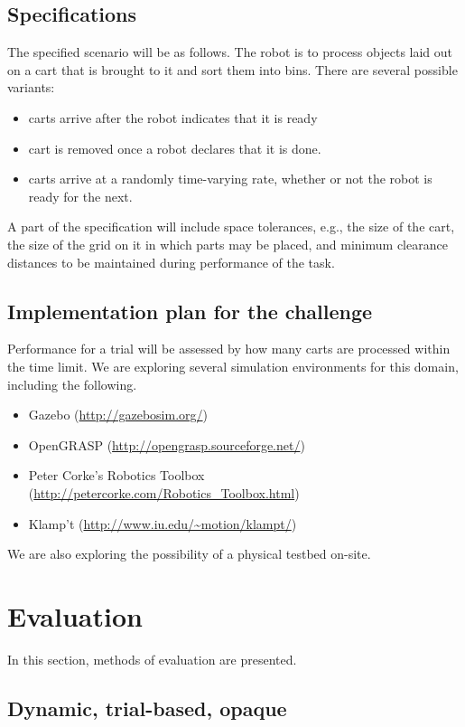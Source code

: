 \documentclass{amsart}
\theoremstyle{definition}
\begin{document}
\subsection{Specifications}
The specified scenario will be as follows. The robot is to process objects laid out on a cart that 
is brought to it and sort them into bins. There are several possible variants:
\begin{itemize}
\item carts arrive after the robot indicates that it is ready
\item cart is removed once a robot declares that it is done.
\item carts arrive at a randomly time-varying rate, whether or not the robot is ready for the next.
\end{itemize}
A part of the specification will include space tolerances, e.g., the size of the
cart, the size of the grid on it in which parts may be placed, and minimum
clearance distances to be maintained during performance of the task.


\subsection{Implementation plan for the challenge}

Performance for a trial will be assessed by how many carts are processed within the time limit.
We are exploring several simulation environments for this domain, including the following.
\begin{itemize}
\item Gazebo (\url{http://gazebosim.org/})
\item OpenGRASP (\url{http://opengrasp.sourceforge.net/})
\item Peter Corke's Robotics Toolbox
(\url{http://petercorke.com/Robotics_Toolbox.html})
\item Klamp't (\url{http://www.iu.edu/~motion/klampt/})
\end{itemize}

We are also exploring the possibility of a physical testbed on-site.

\section{Evaluation}

In this section, methods of evaluation are presented.

\subsection{Dynamic, trial-based, opaque}
\end{document}
